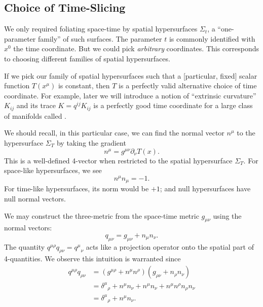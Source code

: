 \subsection{Choice of Time-Slicing}

We only required foliating space-time by spatial hypersurfaces
$\Sigma_{t}$, a ``one-parameter family'' of such surfaces. The parameter
$t$ is commonly identified with $x^{0}$ the time coordinate. But we
could pick \emph{arbitrary} coordinates. This corresponds to choosing
different families of spatial hypersurfaces.

If we pick our family of spatial hypersurfaces such that a [particular,
fixed] scalar function $T(x^{\mu})$ is constant, then $T$ is a perfectly
valid alternative choice of time coordinate. For example, later we will
introduce a notion of ``extrinsic curvature'' $K_{ij}$ and its trace
$K=q^{ij}K_{ij}$ is a perfectly good time coordinate for a large class
of manifolds called .

We should recall, in this particular case, we can find the normal vector
$n^{\mu}$ to the hypersurface $\Sigma_{T}$ by taking the gradient
\begin{equation}
n^{\mu} = g^{\mu\nu}\partial_{\nu}T(x).
\end{equation}
This is a well-defined 4-vector when restricted to the spatial
hypersurface $\Sigma_{T}$. For space-like hypersurfaces, we see
\begin{equation}
n^{\mu}n_{\mu} = -1.
\end{equation}
For time-like hypersurfaces, its norm would be $+1$; and null
hypersurfaces have null normal vectors.

We may construct the three-metric from the space-time metric
$g_{\mu\nu}$ using the normal vectors:
\begin{equation}
q_{\mu\nu} = g_{\mu\nu} + n_{\mu}n_{\nu}.
\end{equation}
The quantity $q^{\mu\rho}q_{\rho\nu} = {q^{\mu}}_{\nu}$ acts like a
projection operator onto the spatial part of 4-quantities. We observe
this intuition is warranted since
\begin{subequations}
\begin{align}
q^{\mu\rho}q_{\rho\nu}
&= (g^{\mu\rho} + n^{\mu}n^{\rho})(g_{\rho\nu} + n_{\rho}n_{\nu})\\
&= {\delta^{\mu}}_{\rho} + n^{\mu}n_{\nu} + n^{\mu}n_{\nu} + n^{\mu}n^{\rho}n_{\rho}n_{\nu}\\
&= {\delta^{\mu}}_{\rho} + n^{\mu}n_{\nu}.
\end{align}
\end{subequations}

